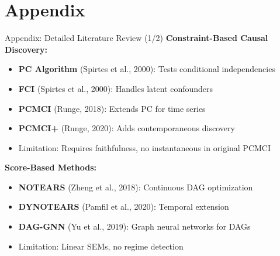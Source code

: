 \documentclass[aspectratio=169]{beamer}
\begin{document}
\appendix
\section{Appendix}

\begin{frame}{Appendix: Detailed Literature Review (1/2)}
\textbf{Constraint-Based Causal Discovery:}
\begin{itemize}
    \item \textbf{PC Algorithm} (Spirtes et al., 2000): Tests conditional independencies
    \item \textbf{FCI} (Spirtes et al., 2000): Handles latent confounders
    \item \textbf{PCMCI} (Runge, 2018): Extends PC for time series
    \item \textbf{PCMCI+} (Runge, 2020): Adds contemporaneous discovery
    \item \textcolor{warnred}{Limitation:} Requires faithfulness, no instantaneous in original PCMCI
\end{itemize}

\vspace{0.3cm}
\textbf{Score-Based Methods:}
\begin{itemize}
    \item \textbf{NOTEARS} (Zheng et al., 2018): Continuous DAG optimization
    \item \textbf{DYNOTEARS} (Pamfil et al., 2020): Temporal extension
    \item \textbf{DAG-GNN} (Yu et al., 2019): Graph neural networks for DAGs
    \item \textcolor{warnred}{Limitation:} Linear SEMs, no regime detection
\end{itemize}
\end{frame}
\end{document}
